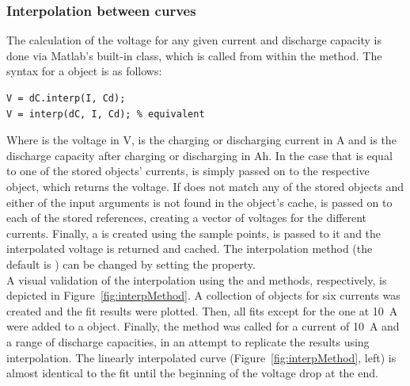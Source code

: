 \subsubsection{Interpolation between curves}
The calculation of the voltage for any given current and discharge capacity is done via Matlab's built-in  class, which is called from within the  method. The syntax for a  object  is as follows:
\begin{lstlisting}
V = dC.interp(I, Cd);
V = interp(dC, I, Cd); % equivalent
\end{lstlisting}
Where  is the voltage in V,  is the charging or discharging current in A and  is the discharge capacity after charging or discharging in Ah. In the case that  is equal to one of the stored  objects' currents,  is simply passed on to the respective object, which returns the voltage. If  does not match any of the stored objects and either of the input arguments is not found in the object's cache,  is passed on to each of the stored  references, creating a vector of voltages for the different currents. Finally, a  is created using the sample points,  is passed to it and the interpolated voltage is returned and cached. The interpolation method (the default is ) can be changed by setting the  property. \\
A visual validation of the interpolation using the  and  methods, respectively, is depicted in Figure~\ref{fig:interpMethod}. A collection of  objects for six currents was created and the fit results were plotted. Then, all fits except for the one at 10~A were added to a  object. Finally, the  method was called for a current of 10~A and a range of discharge capacities, in an attempt to replicate the  results using interpolation. The linearly interpolated curve (Figure~\ref{fig:interpMethod}, left) is almost identical to the fit until the beginning of the voltage drop at the end. 

